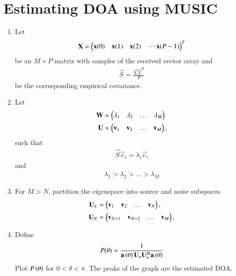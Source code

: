 \documentclass[journal,12pt,twocolumn]{IEEEtran}
\renewcommand\thesection{\arabic{section}}
\begin{document}
\section{Estimating DOA using MUSIC}
\begin{enumerate}[label=\thesection.\arabic*
,ref=\thesection.\theenumi]

\item Let
\begin{align}
\mathbf{X} = \begin{pmatrix}\mathbf{x}(0) & \mathbf{x}(1) & \mathbf{x}(2) & \cdots \mathbf{x}(P-1)\end{pmatrix}^T 
\end{align}
%
be an $M \times P$ matrix with samples of the received vector array and 
\begin{align}
\vec{S} = \frac{\vec{X}\vec{X}^{H}}{P} 
\end{align}
be the corresponding empirical covariance.
\item Let
\begin{align}
\mathbf{W} &= \begin{pmatrix}\lambda_1 & \lambda_2 & \dots & \lambda_M\end{pmatrix}
\nonumber \\
\mathbf{U} &= \begin{pmatrix}\mathbf{v}_1 & \mathbf{v}_2 & \dots & \mathbf{v}_M\end{pmatrix},
\end{align}
such that 
\begin{align}
\vec{S}\vec{v}_i = \lambda_i \vec{v}_i
\end{align}
and 
\begin{align}
\lambda_1 > \lambda_2 > \dots > \lambda_M
\end{align}
\item For $M > N$, partition the eigenspace into source and noise subspaces.
\begin{align}
\mathbf{U}_S &= \begin{pmatrix}\mathbf{v}_1 & \mathbf{v}_2 & \dots & \mathbf{v}_N\end{pmatrix},
\nonumber \\
\mathbf{U}_N &= \begin{pmatrix}\mathbf{v}_{N+1} & \mathbf{v}_{N+2} & \dots & \mathbf{v}_M\end{pmatrix},
\end{align}
%
\item Define
\begin{align}
P(\theta) = \frac{1}{\mathbf{a}\left(\theta\right)\mathbf{U}_n\mathbf{U}_n^{H}\mathbf{a}\left(\theta\right)}
\end{align}
%
Plot $P\left(\theta\right)$ for $0 < \theta < \pi$.  The peaks of the graph are the estimated DOA.
\end{enumerate}
\end{document}
